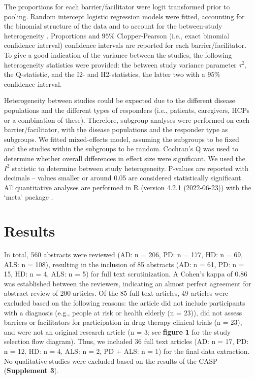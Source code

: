 \documentclass[preprint, 3p,
authoryear]{elsarticle} %
\begin{document}
The proportions for each barrier/facilitator were logit transformed
prior to pooling. Random intercept logistic regression models were
fitted, accounting for the binomial structure of the data and to account
for the between-study heterogeneity \citep{stijnen2010}. Proportions and
\(95\%\) Clopper-Pearson (i.e., exact binomial confidence interval)
confidence intervals \citep{clopper1934} are reported for each
barrier/facilitator. To give a good indication of the variance between
the studies, the following heterogeneity statistics were provided: the
between study variance parameter \(\tau^2\), the Q-statistic, and the
I2- and H2-statistics, the latter two with a \(95\%\) confidence
interval.

Heterogeneity between studies could be expected due to the different
disease populations and the different types of responders (i.e.,
patients, caregivers, HCPs or a combination of these). Therefore,
subgroup analyses were performed on each barrier/facilitator, with the
disease populations and the responder type as subgroups. We fitted
mixed-effects model, assuming the subgroups to be fixed and the studies
within the subgroups to be random. Cochran's Q \citep{cochran1954} was
used to determine whether overall differences in effect size were
significant. We used the \(I^2\) statistic \citep{higgins2002} to
determine between study heterogeneity. P-values are reported with
decimals -- values smaller or around 0.05 are considered statistically
significant. All quantitative analyses are performed in R (version 4.2.1
(2022-06-23)) \citep{Rmanual} with the `meta' package \citep{meta}.

\hypertarget{results}{%
\section{Results}\label{results}}

In total, 560 abstracts were reviewed (AD: n = 206, PD: n = 177, HD: n =
69, ALS: n = 108), resulting in the inclusion of 85 abstracts (AD: n =
61, PD: n = 15, HD: n = 4, ALS: n = 5) for full text scrutinization. A
Cohen's kappa of 0.86 was established between the reviewers, indicating
an almost perfect agreement for abstract review of 200 articles. Of the
85 full text articles, 49 articles were excluded based on the following
reasons: the article did not include participants with a diagnosis
(e.g., people at risk or health elderly (n = 23)), did not assess
barriers or facilitators for participation in drug therapy clinical
trials (n = 23), and were not an original research article (n = 3; see
\textbf{figure 1} for the study selection flow diagram). Thus, we
included 36 full text articles (AD: n = 17, PD: n = 12, HD: n = 4, ALS:
n = 2, PD \(+\) ALS: n = 1) for the final data extraction. No
qualitative studies were excluded based on the results of the CASP
(\textbf{Supplement 3}).
\end{document}
